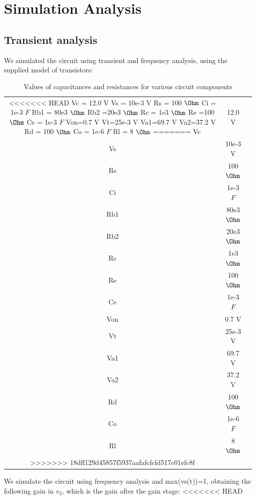 \section{Simulation Analysis}
\label{sec:simulation}

\subsection{Transient analysis}

We simulated the circuit using transient and frequency analysis, using the supplied model of transistors:

\begin{table}[H]
\addtolength{\tabcolsep}{-4pt}
\caption{Values of capacitances and resistances for various circuit components}
\vspace{-3mm}
\begin{tabular}{|c|c|c|}
\hline
<<<<<<< HEAD
Vc = 12.0 V
Vs = 10e-3 V
Rs = 100 $\Ohm$
Ci = 1e-3 $F$
Rb1 = 80e3 $\Ohm$
Rb2 =20e3 $\Ohm$
Rc = 1e3 $\Ohm$
Re =100 $\Ohm$
Ce = 1e-3 $F$
Von=0.7 V
Vt=25e-3 V
Va1=69.7 V
Va2=37.2 V
Rd = 100 $\Ohm$
Co = 1e-6 $F$
Rl = 8 $\Ohm$
=======
Vc & 12.0 V\\
Vs & 10e-3 V\\
Rs & 100 $\Ohm$\\
Ci & 1e-3 $F$\\
Rb1& 80e3 $\Ohm$\\
Rb2&20e3 $\Ohm$\\
Rc & 1e3 $\Ohm$\\
Re &100 $\Ohm$\\
Ce & 1e-3 $F$\\
Von&0.7 V\\
Vt&25e-3 V\\
Va1&69.7 V\\
Va2&37.2 V\\
Rd & 100 $\Ohm$\\
Co & 1e-6 $F$\\
Rl & 8 $\Ohm$\\
>>>>>>> 18dff129d45857f5937aafafcfcfd517c01efc8f

\hline
\end{tabular}
\label{tab:Components}
\end{table}

\par

We simulate the circuit using frequency analysis and max(vs(t))=1, obtaining the following gain in $v_2$, which is the gain after the gain stage:
<<<<<<< HEAD

